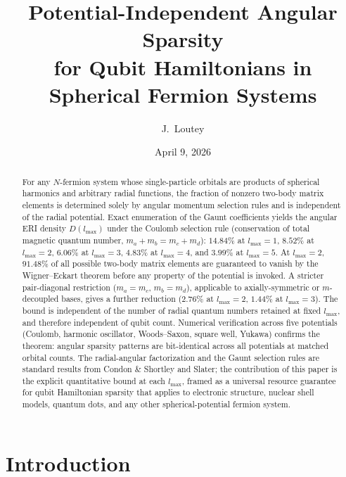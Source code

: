 \documentclass[twocolumn,pra,amsmath,amssymb,superscriptaddress]{revtex4-2}
\begin{document}
\title{Potential-Independent Angular Sparsity\\for Qubit Hamiltonians in Spherical Fermion Systems}

\author{J.~Loutey}

\date{April 9, 2026}

\begin{abstract}
For any $N$-fermion system whose single-particle orbitals are products
of spherical harmonics and arbitrary radial functions, the fraction of
nonzero two-body matrix elements is determined solely by angular
momentum selection rules and is independent of the radial potential.
Exact enumeration of the Gaunt coefficients yields the angular ERI
density $D(l_{\max})$ under the Coulomb selection rule (conservation
of total magnetic quantum number, $m_a+m_b=m_c+m_d$): $14.84\%$ at
$l_{\max}=1$, $8.52\%$ at $l_{\max}=2$, $6.06\%$ at $l_{\max}=3$,
$4.83\%$ at $l_{\max}=4$, and $3.99\%$ at $l_{\max}=5$.  At
$l_{\max}=2$, $91.48\%$ of all possible two-body matrix elements are
guaranteed to vanish by the Wigner--Eckart theorem before any
property of the potential is invoked.  A stricter pair-diagonal
restriction ($m_a=m_c$, $m_b=m_d$), applicable to axially-symmetric
or $m$-decoupled bases, gives a further reduction ($2.76\%$ at
$l_{\max}=2$, $1.44\%$ at $l_{\max}=3$).  The bound is independent of the number of radial quantum
numbers retained at fixed $l_{\max}$, and therefore independent of
qubit count.  Numerical verification across five potentials (Coulomb,
harmonic oscillator, Woods--Saxon, square well, Yukawa) confirms the
theorem: angular sparsity patterns are bit-identical across all
potentials at matched orbital counts.  The radial-angular
factorization and the Gaunt selection rules are standard results from
Condon \& Shortley and Slater; the contribution of this paper is the
explicit quantitative bound at each $l_{\max}$, framed as a universal
resource guarantee for qubit Hamiltonian sparsity that applies to
electronic structure, nuclear shell models, quantum dots, and any
other spherical-potential fermion system.
\end{abstract}

\maketitle

\section{Introduction}
\label{sec:intro}
\end{document}
